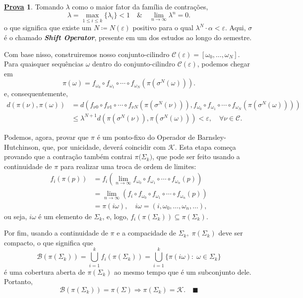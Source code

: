 \documentclass[12pt]{article}
\theoremstyle{definition}
\newtheorem*{proof*}{\underline{Prova}}
\renewcommand\qedsymbol{$\blacksquare$}
\begin{document}
\begin{proof*}
	Tomando \(\lambda \) como o maior fator da família de contrações,
	\[
		\lambda =\max_{1\leq i\leq k}\{\lambda_{i}\} < 1 \quad\&\quad \lim_{n\to \infty}\lambda^{n}=0.
	\]
	o que significa que existe um \(N\coloneqq N(\varepsilon )\) positivo para o qual		\(\lambda^{N}\cdot \alpha < \varepsilon\). Aqui, \(\sigma \) é o chamado \textit{\textbf{Shift Operator}},
	presente em um dos estudos ao longo do semestre.

	Com base nisso, construiremos nosso conjunto-cilindro \(\mathcal{C}(\varepsilon ) = [\omega_{0}, \dotsc , \omega_{N}]\).
	Para quaisquer sequências \(\omega \) dentro do conjunto-cilindro \(\mathcal{C}(\varepsilon )\), podemos chegar em
	\[
		\pi (\omega ) = f_{\omega_{0}}\circ f_{\omega_{1}}\circ\cdots\circ f_{\omega_{N}}(\pi(\sigma^{N}(\omega ))).
	\]
	e, consequentemente,
	\begin{align*}
		d(\pi (\nu), \pi (\omega )) & = d(f_{\nu{0}}\circ f_{\nu{1}}\circ\cdots\circ f_{\nu{N}}(\pi(\sigma^{N}(\nu ))), f_{\omega_{0}}\circ f_{\omega_{1}}\circ\cdots\circ f_{\omega_{N}}(\pi(\sigma^{N}(\omega )))) \\
		                            & \leq \lambda^{N+1}d(\pi(\sigma^{N}(\nu)), \pi(\sigma^{N}(\omega)))<\varepsilon ,\quad \forall \nu\in \mathcal{C}.
	\end{align*}

	Podemos, agora, provar que \(\pi \) é um ponto-fixo do Operador de Barnsley-Hutchinson, que, por unicidade, deverá coincidir com \(\mathcal{K}\).
	Esta etapa começa provando que a contração também contrai \(\pi \bigl(\Sigma_{k} \bigr)\), que pode ser feito usando a continuidade de \(\pi \)
	para realizar uma troca de ordem de limites:
	\begin{align*}
		f_{i}(\pi(p)) & = f_{i}(\lim_{n\to \infty}f_{\omega_{0}}\circ f_{\omega_{1}}\circ\cdots\circ f_{\omega_{n}}(p))       \\
		              & = \lim_{n\to \infty}(f_{i}\circ f_{\omega_{0}}\circ f_{\omega_{1}}\circ\cdots\circ f_{\omega_{n}}(p)) \\
		              & = \pi(i\omega ),\quad i\omega = (i, \omega_{0}, \dotsc , \omega_{n}, \dotsc ),
	\end{align*}
	ou seja, \(i\omega \) é um elemento de \(\Sigma_{k} \), e, logo, \(f_{i}(\pi(\Sigma_{k}))\subseteq \pi(\Sigma_{k})\).

	Por fim, usando a continuidade de \(\pi \) e a compacidade de \(\Sigma_{k} , \; \pi(\Sigma_{k})\) deve ser compacto, o que significa que
	\[
		\mathcal{B}(\pi(\Sigma_{k}))=\bigcup_{i=1}^{k}f_{i}(\pi(\Sigma_{k}))=\bigcup_{i=1}^{k}\{\pi(i\omega ):\;\omega \in \Sigma_{k}\}
	\]
	é uma cobertura aberta de \(\pi(\Sigma_{k})\) ao mesmo tempo que é um subconjunto dele. Portanto,
	\[
		\mathcal{B}(\pi(\Sigma_{k}))=\pi(\Sigma ) \Rightarrow \pi(\Sigma_{k})=\mathcal{K}.\quad \text{\qedsymbol}
	\]
\end{proof*}
\end{document}
